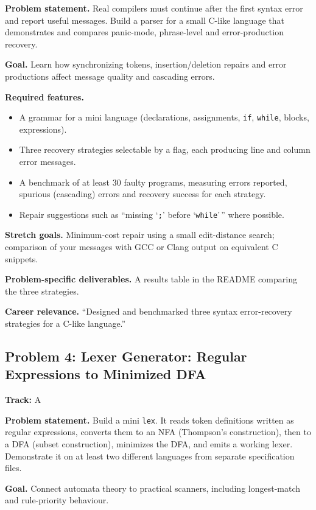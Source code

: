 \documentclass[11pt,a4paper]{article}
\newcommand{\fld}[1]{\par\smallskip\textbf{\color{accent}#1}\quad}
\newcommand{\meta}[1]{%
  \begin{tcolorbox}[colback=softbg,colframe=softbg,boxsep=2pt,left=4pt,right=4pt,top=2pt,bottom=2pt,arc=2pt]
  \small\textbf{Track:} #1
  \end{tcolorbox}}
\begin{document}
\fld{Problem statement.} Real compilers must continue after the first syntax error and report useful
messages. Build a parser for a small C-like language that demonstrates and compares panic-mode,
phrase-level and error-production recovery.

\fld{Goal.} Learn how synchronizing tokens, insertion/deletion repairs and error productions affect
message quality and cascading errors.

\fld{Required features.}
\begin{itemize}
  \item A grammar for a mini language (declarations, assignments, \texttt{if}, \texttt{while}, blocks, expressions).
  \item Three recovery strategies selectable by a flag, each producing line and column error messages.
  \item A benchmark of at least 30 faulty programs, measuring errors reported, spurious (cascading) errors and recovery success for each strategy.
  \item Repair suggestions such as ``missing `\texttt{;}' before `\texttt{while}'\,'' where possible.
\end{itemize}

\fld{Stretch goals.} Minimum-cost repair using a small edit-distance search; comparison of your messages
with GCC or Clang output on equivalent C snippets.

\fld{Problem-specific deliverables.} A results table in the README comparing the three strategies.

\fld{Career relevance.} ``Designed and benchmarked three syntax error-recovery strategies for a C-like language.''

\subsection{Problem 4: Lexer Generator: Regular Expressions to Minimized DFA}
\meta{A}

\fld{Problem statement.} Build a mini \texttt{lex}. It reads token definitions written as regular
expressions, converts them to an NFA (Thompson's construction), then to a DFA (subset construction),
minimizes the DFA, and emits a working lexer. Demonstrate it on at least two different languages
from separate specification files.

\fld{Goal.} Connect automata theory to practical scanners, including longest-match and rule-priority behaviour.
\end{document}
